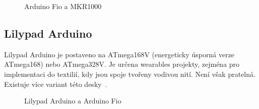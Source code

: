 	
	\begin{figure}[!ht]
    \centering
			\hspace*{5mm}
		\caption{Arduino Fio a MKR1000}
\end{figure}
	
		\subsection{Lilypad Arduino} 
		Lilypad Arduino je postaveno na ATmega168V (energeticky úsporná verze ATmega168) nebo ATmega328V. Je určena wearables projekty, zejména pro implementaci do textilií, kdy jsou spoje tvořeny vodivou nití. Není však pratelná. Existuje více variant této desky~\cite{ArduinoLilipad}.	
	
	\begin{figure}[!ht]
    \centering
			\hspace*{5mm}
					\caption{Lilypad Arduino a Arduino Fio}
\end{figure}
	
